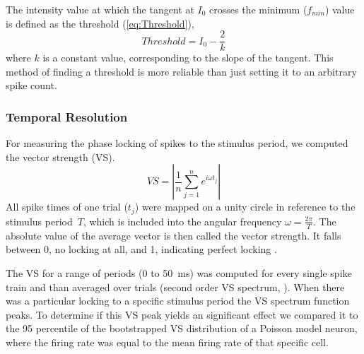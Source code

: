 \documentclass[12pt,a4paper]{article}
\begin{document}
The intensity value at which the tangent at $I_{0}$ crosses the minimum ($f_{min}$) value is defined as the threshold (\ref{eq:Threshold}),  
\begin{equation}
\label{eq:Threshold}
Threshold = I_{0} - \frac{2}{k}
\end{equation}
where $k$ is a constant value, corresponding to the slope of the tangent.
This method of finding a threshold is more reliable than just setting it to an arbitrary spike count.


\subsubsection{Temporal Resolution}
For measuring the phase locking of spikes to the stimulus period, we computed the vector strength (VS). 
\begin{equation}
\label{eq:VS}
VS = \left|\frac{1}{n} \sum_{j=1}^{n}e^{i\omega t_j}\right|
\end{equation}
All spike times of one trial ($t_{j}$) were mapped on a unity circle in reference to the stimulus period~$T$, which is included into the angular frequency $\omega = \frac{2\pi}{T}$. The absolute value of the average vector is then called the vector strength. It falls between 0, no locking at all, and 1, indicating perfect locking \parencite{vanhemmen_vector_2013}. 

The VS for a range of periods (0 to 50~ms) was computed for every single spike train and than averaged over trials (second order VS spectrum, \parencite{sinz_simultaneous_2020}). 
When there was a particular locking to a specific stimulus period the VS spectrum function peaks. To determine if this VS peak yields an significant effect we compared it to the 95 percentile of the bootstrapped VS distribution of a Poisson model neuron, where the firing rate was equal to the mean firing rate of that specific cell.
\end{document}
